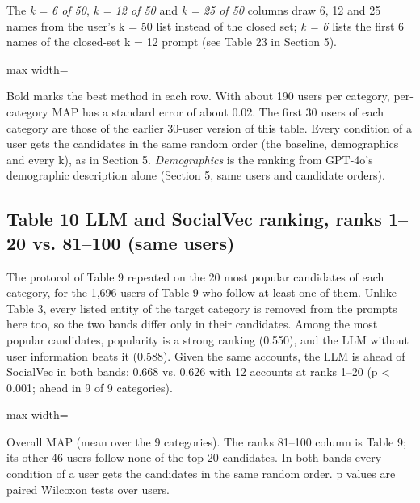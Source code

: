 \documentclass[10pt]{article}
\begin{document}
The \emph{k = 6 of 50}, \emph{k = 12 of 50} and \emph{k = 25 of 50} columns draw 6, 12 and 25 names from the user's k = 50 list instead of the closed set; \emph{k = 6} lists the first 6 names of the closed-set k = 12 prompt (see Table 23 in Section 5).

\begin{center}\begin{adjustbox}{max width=\linewidth}

\end{adjustbox}\end{center}

{\small Bold marks the best method in each row. With about 190 users per category, per-category MAP has a standard error of about 0.02. The first 30 users of each category are those of the earlier 30-user version of this table. Every condition of a user gets the candidates in the same random order (the baseline, demographics and every k), as in Section 5. \emph{Demographics} is the ranking from GPT-4o's demographic description alone (Section 5, same users and candidate orders).}

\subsection*{Table 10 \textperiodcentered{} LLM and SocialVec ranking, ranks 1--20 vs. 81--100 (same users)}
The protocol of Table 9 repeated on the 20 most popular candidates of each category, for the 1,696 users of Table 9 who follow at least one of them. Unlike Table 3, every listed entity of the target category is removed from the prompts here too, so the two bands differ only in their candidates. Among the most popular candidates, popularity is a strong ranking (0.550), and the LLM without user information beats it (0.588). Given the same accounts, the LLM is ahead of SocialVec in both bands: 0.668 vs. 0.626 with 12 accounts at ranks 1--20 (p \textless{} 0.001; ahead in 9 of 9 categories).

\begin{center}\begin{adjustbox}{max width=\linewidth}

\end{adjustbox}\end{center}

{\small Overall MAP (mean over the 9 categories). The ranks 81--100 column is Table 9; its other 46 users follow none of the top-20 candidates. In both bands every condition of a user gets the candidates in the same random order. p values are paired Wilcoxon tests over users.}
\end{document}
